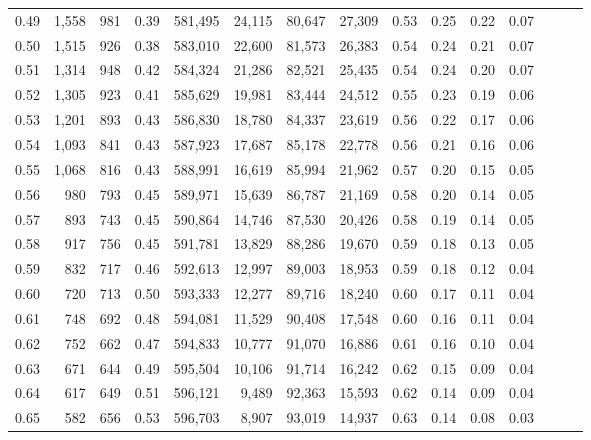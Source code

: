 \begin{tabular}{rrrrrrrrrrrrrrr}
0.49 &   1,558 &    981 &  0.39 &  581,495 &   24,115 &   80,647 &   27,309 &  0.53 &  0.25 &  0.22 &      0.07 \\
0.50 &   1,515 &    926 &  0.38 &  583,010 &   22,600 &   81,573 &   26,383 &  0.54 &  0.24 &  0.21 &      0.07 \\
0.51 &   1,314 &    948 &  0.42 &  584,324 &   21,286 &   82,521 &   25,435 &  0.54 &  0.24 &  0.20 &      0.07 \\
0.52 &   1,305 &    923 &  0.41 &  585,629 &   19,981 &   83,444 &   24,512 &  0.55 &  0.23 &  0.19 &      0.06 \\
0.53 &   1,201 &    893 &  0.43 &  586,830 &   18,780 &   84,337 &   23,619 &  0.56 &  0.22 &  0.17 &      0.06 \\
0.54 &   1,093 &    841 &  0.43 &  587,923 &   17,687 &   85,178 &   22,778 &  0.56 &  0.21 &  0.16 &      0.06 \\
0.55 &   1,068 &    816 &  0.43 &  588,991 &   16,619 &   85,994 &   21,962 &  0.57 &  0.20 &  0.15 &      0.05 \\
0.56 &     980 &    793 &  0.45 &  589,971 &   15,639 &   86,787 &   21,169 &  0.58 &  0.20 &  0.14 &      0.05 \\
0.57 &     893 &    743 &  0.45 &  590,864 &   14,746 &   87,530 &   20,426 &  0.58 &  0.19 &  0.14 &      0.05 \\
0.58 &     917 &    756 &  0.45 &  591,781 &   13,829 &   88,286 &   19,670 &  0.59 &  0.18 &  0.13 &      0.05 \\
0.59 &     832 &    717 &  0.46 &  592,613 &   12,997 &   89,003 &   18,953 &  0.59 &  0.18 &  0.12 &      0.04 \\
0.60 &     720 &    713 &  0.50 &  593,333 &   12,277 &   89,716 &   18,240 &  0.60 &  0.17 &  0.11 &      0.04 \\
0.61 &     748 &    692 &  0.48 &  594,081 &   11,529 &   90,408 &   17,548 &  0.60 &  0.16 &  0.11 &      0.04 \\
0.62 &     752 &    662 &  0.47 &  594,833 &   10,777 &   91,070 &   16,886 &  0.61 &  0.16 &  0.10 &      0.04 \\
0.63 &     671 &    644 &  0.49 &  595,504 &   10,106 &   91,714 &   16,242 &  0.62 &  0.15 &  0.09 &      0.04 \\
0.64 &     617 &    649 &  0.51 &  596,121 &    9,489 &   92,363 &   15,593 &  0.62 &  0.14 &  0.09 &      0.04 \\
0.65 &     582 &    656 &  0.53 &  596,703 &    8,907 &   93,019 &   14,937 &  0.63 &  0.14 &  0.08 &      0.03 \\

\end{tabular}
